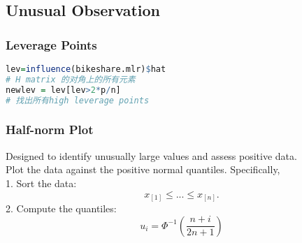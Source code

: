 \documentclass[11pt,a4paper]{article}
\begin{document}
\subsection{Unusual Observation}
\subsubsection{Leverage Points}
\begin{lstlisting}[language=R]
lev=influence(bikeshare.mlr)$hat
# H matrix 的对角上的所有元素
newlev = lev[lev>2*p/n]
# 找出所有high leverage points
\end{lstlisting}

\subsubsection{Half-norm Plot}
Designed to identify unusually large values and assess positive data.\\
Plot the data against the positive normal quantiles. Speciﬁcally,\\
1. Sort the data:
$$x_{[1]} \leq ... \leq x_{[n]}.$$
2. Compute the quantiles:
$$u_i=\Phi^{-1}(\frac{n+i}{2n+1})$$
\end{document}
